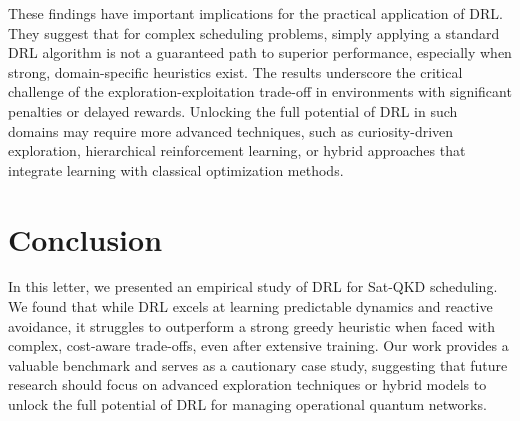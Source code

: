 \documentclass[manuscript, review, nonacm]{acmart}
\begin{document}
These findings have important implications for the practical application of DRL. They suggest that for complex scheduling problems, simply applying a standard DRL algorithm is not a guaranteed path to superior performance, especially when strong, domain-specific heuristics exist. The results underscore the critical challenge of the exploration-exploitation trade-off in environments with significant penalties or delayed rewards. Unlocking the full potential of DRL in such domains may require more advanced techniques, such as curiosity-driven exploration, hierarchical reinforcement learning, or hybrid approaches that integrate learning with classical optimization methods.


\section{Conclusion}\label{sec:conclusion}
In this letter, we presented an empirical study of DRL for Sat-QKD scheduling. We found that while DRL excels at learning predictable dynamics and reactive avoidance, it struggles to outperform a strong greedy heuristic when faced with complex, cost-aware trade-offs, even after extensive training. Our work provides a valuable benchmark and serves as a cautionary case study, suggesting that future research should focus on advanced exploration techniques or hybrid models to unlock the full potential of DRL for managing operational quantum networks.



\end{document}
